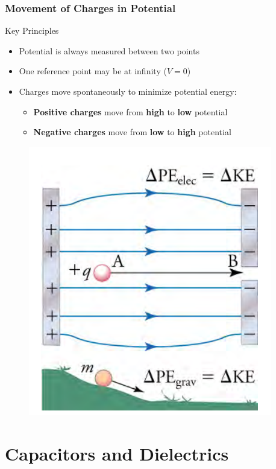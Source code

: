 \documentclass{beamer}
\begin{document}
\begin{frame}
    \frametitle{Movement of Charges in Potential}
    \begin{block}{Key Principles}
        \begin{itemize}
            \item Potential is always measured between two points
            \item One reference point may be at infinity ($V = 0$)
            \item Charges move spontaneously to minimize potential energy:
                \begin{itemize}
                    \item \textbf{Positive charges} move from \textbf{high} to \textbf{low} potential
                    \item \textbf{Negative charges} move from \textbf{low} to \textbf{high} potential
                \end{itemize}
        \end{itemize}
    \end{block}
    \end{frame}

\begin{frame}
    
       \begin{figure}
           \centering
           \includegraphics[width=0.6\linewidth]{jyrstgfs.png}
       \end{figure}
    
\end{frame}

\section{Capacitors and Dielectrics}
\end{document}

